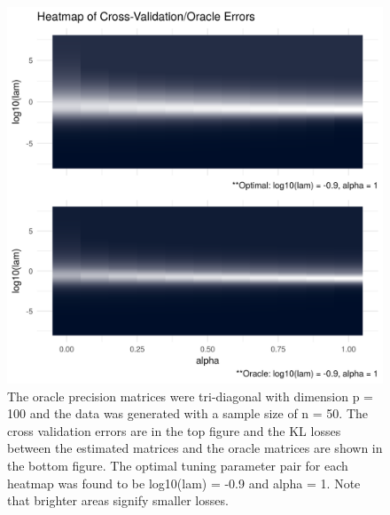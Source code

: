 \documentclass[11pt,]{report}
\theoremstyle{definition}
\theoremstyle{definition}
\theoremstyle{definition}
\theoremstyle{remark}
\begin{document}
\vspace{1cm}

\begin{figure}

{\centering \includegraphics[width=0.85\linewidth,]{images/repsKLtridiag_N50_P100} 

}

\caption{The oracle precision matrices were tri-diagonal with dimension p = 100 and the data was generated with a sample size of n = 50. The cross validation errors are in the top figure and the KL losses between the estimated matrices and the oracle matrices are shown in the bottom figure. The optimal tuning parameter pair for each heatmap was found to be log10(lam) = -0.9 and alpha = 1. Note that brighter areas signify smaller losses.}\label{fig:admmsim5}
\end{figure}
\end{document}
